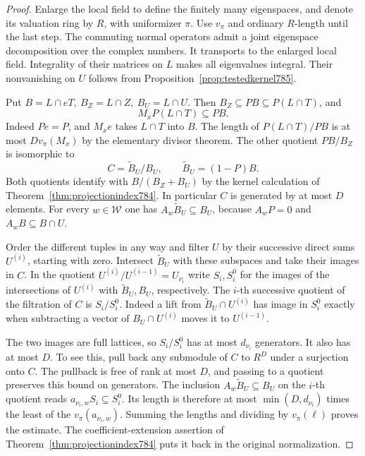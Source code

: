 \documentclass[a4paper,11pt]{article}
\theoremstyle{definition}
\theoremstyle{remark}
\numberwithin{equation}{section}
\begin{document}
\begin{proof}
Enlarge the local field to define the finitely many
eigenspaces, and denote its valuation ring by \(R\),
with uniformizer \(\pi\). Use \(v_\pi\) and ordinary
\(R\)-length until the last step. The commuting normal
operators admit a joint eigenspace decomposition over
the complex numbers. It transports to the enlarged
local field. Integrality of their matrices on \(L\)
makes all eigenvalues integral. Their nonvanishing on
\(U\) follows from Proposition~\ref{prop:testedkernel785}.

Put \(B=L\cap eT,\ B_Z=L\cap Z,\ B_U=L\cap U\).
Then \(B_Z\subseteq PB\subseteq P(L\cap T)\), and
\[
                 M_x P(L\cap T)\subseteq PB.
\]
Indeed \(Pe=P\), and \(M_x e\) takes \(L\cap T\)
into \(B\). The length of \(P(L\cap T)/PB\) is at
most \(D v_\pi(M_x)\) by the elementary divisor theorem.
The other quotient \(PB/B_Z\) is isomorphic to
\[
         C=\widetilde B_U/B_U,\qquad
                      \widetilde B_U=(1-P)B.
\]
Both quotients identify with \(B/(B_Z+B_U)\) by the
kernel calculation of Theorem~\ref{thm:projectionindex784}.
In particular \(C\) is generated by at most \(D\) elements.
For every \(w\in\mathcal W\) one has
\(A_w\widetilde B_U\subseteq B_U\), because \(A_wP=0\)
and \(A_w B\subseteq B\cap U\).

Order the different tuples in any way and filter \(U\)
by their successive direct sums \(U^{(i)}\), starting
with zero. Intersect \(\widetilde B_U\) with these
subspaces and take their images in \(C\). In the quotient
\(U^{(i)}/U^{(i-1)}=U_{\nu_i}\) write \(S_i,S_i^0\)
for the images of the intersections of \(U^{(i)}\)
with \(\widetilde B_U,B_U\), respectively. The \(i\)-th
successive quotient of the filtration of \(C\) is
\(S_i/S_i^0\). Indeed a lift from
\(\widetilde B_U\cap U^{(i)}\) has image in \(S_i^0\)
exactly when subtracting a vector of \(B_U\cap U^{(i)}\)
moves it to \(U^{(i-1)}\).

The two images are full lattices, so \(S_i/S_i^0\)
has at most \(d_{\nu_i}\) generators. It also has at
most \(D\). To see this, pull back any submodule of
\(C\) to \(R^D\) under a surjection onto \(C\).
The pullback is free of rank at most \(D\), and
passing to a quotient preserves this bound on generators.
The inclusion \(A_w\widetilde B_U\subseteq B_U\)
on the \(i\)-th quotient reads
\(a_{\nu_i,w}S_i\subseteq S_i^0\). Its length is
therefore at most \(\min(D,d_{\nu_i})\) times the least
of the \(v_\pi(a_{\nu_i,w})\). Summing the lengths
and dividing by \(v_\pi(\ell)\) proves the estimate.
The coefficient-extension assertion of
Theorem~\ref{thm:projectionindex784} puts it back in
the original normalization.
\end{proof}
\end{document}
